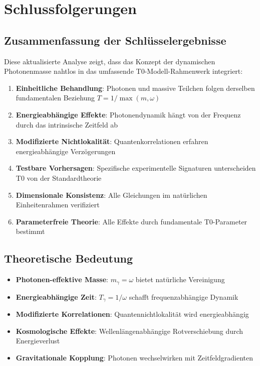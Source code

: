 \documentclass[12pt,a4paper]{article}
\begin{document}
	\section{Schlussfolgerungen}
	
	\subsection{Zusammenfassung der Schlüsselergebnisse}
	
	Diese aktualisierte Analyse zeigt, dass das Konzept der dynamischen Photonenmasse nahtlos in das umfassende T0-Modell-Rahmenwerk integriert:
	
	\begin{enumerate}
		\item \textbf{Einheitliche Behandlung}: Photonen und massive Teilchen folgen derselben fundamentalen Beziehung $T = 1/\max(m,\omega)$
		\item \textbf{Energieabhängige Effekte}: Photonendynamik hängt von der Frequenz durch das intrinsische Zeitfeld ab
		\item \textbf{Modifizierte Nichtlokalität}: Quantenkorrelationen erfahren energieabhängige Verzögerungen
		\item \textbf{Testbare Vorhersagen}: Spezifische experimentelle Signaturen unterscheiden T0 von der Standardtheorie
		\item \textbf{Dimensionale Konsistenz}: Alle Gleichungen im natürlichen Einheitenrahmen verifiziert
		\item \textbf{Parameterfreie Theorie}: Alle Effekte durch fundamentale T0-Parameter bestimmt
	\end{enumerate}
	
	\subsection{Theoretische Bedeutung}
	
	\begin{tcolorbox}[colback=green!5!white,colframe=green!75!black,title=T0-Modell: Dynamische Photonenmasse-Ergebnisse]
		\begin{itemize}
			\item \textbf{Photonen-effektive Masse}: $m_\gamma = \omega$ bietet natürliche Vereinigung
			\item \textbf{Energieabhängige Zeit}: $T_\gamma = 1/\omega$ schafft frequenzabhängige Dynamik
			\item \textbf{Modifizierte Korrelationen}: Quantennichtlokalität wird energieabhängig
			\item \textbf{Kosmologische Effekte}: Wellenlängenabhängige Rotverschiebung durch Energieverlust
			\item \textbf{Gravitationale Kopplung}: Photonen wechselwirken mit Zeitfeldgradienten
		\end{itemize}
	\end{tcolorbox}
	
\end{document}
